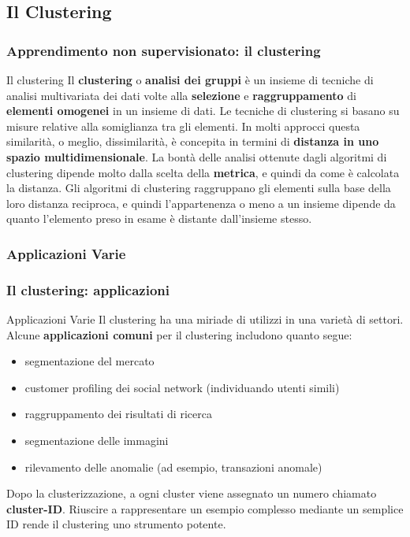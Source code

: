 \subsection[Il Clustering]{Il Clustering}

\begin{frame}
	
	\frametitle{Apprendimento non supervisionato: il clustering}
	
	\begin{block}{Il clustering}
		Il \textbf{clustering} o \textbf{analisi dei gruppi} è un insieme di tecniche di analisi multivariata dei dati volte alla \textbf{selezione} e \textbf{raggruppamento} di \textbf{elementi omogenei} in un insieme di dati.
		\newlinedouble
		Le tecniche di clustering si basano su misure relative alla somiglianza tra gli elementi. In molti approcci questa similarità, o meglio, dissimilarità, è concepita in termini di \textbf{distanza in uno spazio multidimensionale}.
		\newlinedouble
		La bontà delle analisi ottenute dagli algoritmi di clustering dipende molto dalla scelta della \textbf{metrica}, e quindi da come è calcolata la distanza. Gli algoritmi di clustering raggruppano gli elementi sulla base della loro distanza reciproca, e quindi l'appartenenza o meno a un insieme dipende da quanto l'elemento preso in esame è distante dall'insieme stesso.
	\end{block}

\end{frame}


\subsubsection[Applicazioni Varie]{Applicazioni Varie}
\begin{frame}
	
	\frametitle{Il clustering: applicazioni}
	
	\begin{block}{Applicazioni Varie}
		Il clustering ha una miriade di utilizzi in una varietà di settori.\\
		Alcune \textbf{applicazioni comuni} per il clustering includono quanto segue:
		\begin{itemize}
			\item segmentazione del mercato
			\item customer profiling dei social network (individuando utenti simili)
			\item raggruppamento dei risultati di ricerca
			\item segmentazione delle immagini
			\item rilevamento delle anomalie (ad esempio, transazioni anomale)
		\end{itemize}
		
		Dopo la clusterizzazione, a ogni cluster viene assegnato un numero chiamato \textbf{cluster-ID}.
		Riuscire a rappresentare un esempio complesso mediante un semplice ID  rende il clustering uno strumento potente.
	\end{block}
		
\end{frame}


